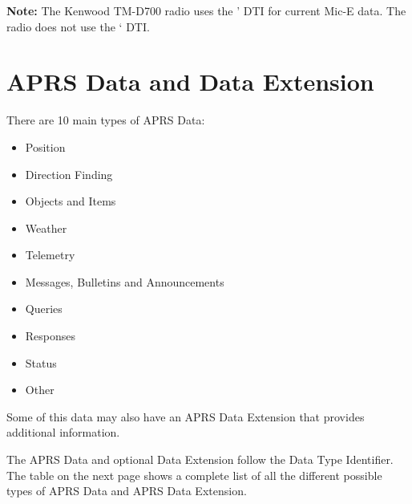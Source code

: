 
\textbf{Note:} The Kenwood TM-D700 radio uses the ' DTI for current Mic-E data.
The radio does not use the ‘ DTI.

\clearpage

\section{APRS Data and Data Extension}



There are 10 main types of APRS Data:

\begin {itemize}

\item Position
\item Direction Finding
\item Objects and Items
\item Weather
\item Telemetry
\item Messages, Bulletins and Announcements
\item Queries
\item Responses
\item Status
\item Other

\end{itemize}

Some of this data may also have an APRS Data Extension that provides
additional information.

The APRS Data and optional Data Extension follow the Data Type Identifier.
The table on the next page shows a complete list of all the different possible
types of APRS Data and APRS Data Extension.

\newpage

